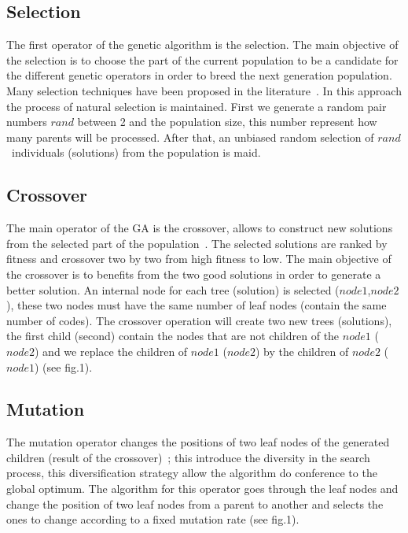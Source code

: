 \documentclass[preprint,12pt]{elsarticle}
\begin{document}
\subsection{Selection}
The first operator of the genetic algorithm is the selection. The main objective of the selection is to choose the part of the current  population to be a candidate for the different genetic operators in order to breed the next generation population. Many selection techniques have been proposed in the literature~\cite{bli95}. In this approach the  process of natural selection is maintained. First we generate a random pair numbers \textit{$rand$} between 2 and the population size, this number represent how many parents will be processed. After that, an unbiased random selection of \textit{$rand$}~individuals (solutions) from the population is maid. 
\subsection{Crossover}
The main operator of the GA is the crossover, allows to construct new solutions from the selected part of the population~\cite{osa14}. The selected solutions are ranked by fitness and crossover two by two from high fitness to low. The main objective of the crossover is to benefits from the two good solutions in order to generate a better solution. An internal node for each tree (solution) is selected (\textit{$node1$},\textit{$node2$}), these two nodes must have the same number of leaf nodes (contain the same number of codes). The crossover operation will create two new trees (solutions), the first child (second) contain the nodes that are not children of the \textit{$node1$} (\textit{$node2$}) and we replace the children of \textit{$node1$} (\textit{$node2$}) by the children of \textit{$node2$} (\textit{$node1$}) (see fig.1). 
\subsection{Mutation}
The mutation operator changes the positions of two leaf nodes of the generated children (result of the crossover)~\cite{muhlenbein1992genetic}; this introduce the diversity in the search process, this diversification strategy allow the algorithm do conference to the global optimum. The algorithm for this operator goes through the leaf nodes and change the position of two leaf nodes from a parent to another and selects the ones to change according to a fixed mutation rate (see fig.1).
\end{document}
